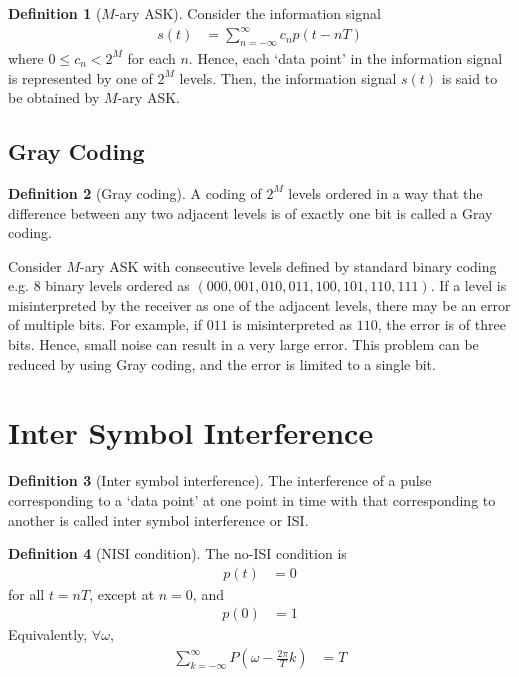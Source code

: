 \documentclass[titlepage, fleqn, a4paper, 12pt, twoside]{article}
\theoremstyle{definition}
\newtheorem{definition}{Definition}
\theoremstyle{theorem}
\begin{document}
\begin{definition}[$M$-ary ASK]
	Consider the information signal
	\begin{align*}
		s(t) &= \sum\limits_{n = -\infty}^{\infty} c_n p(t - n T)
	\end{align*}
	where $0 \le c_n < 2^M$ for each $n$.
	Hence, each `data point' in the information signal is represented by one of $2^M$ levels.
	Then, the information signal $s(t)$ is said to be obtained by $M$-ary ASK.
\end{definition}

\subsection{Gray Coding}

\begin{definition}[Gray coding]
	A coding of $2^M$ levels ordered in a way that the difference between any two adjacent levels is of exactly one bit is called a Gray coding.
\end{definition}

Consider $M$-ary ASK with consecutive levels defined by standard binary coding e.g. $8$ binary levels ordered as $(000,001,010,011,100,101,110,111)$.
If a level is misinterpreted by the receiver as one of the adjacent levels, there may be an error of multiple bits.
For example, if $011$ is misinterpreted as $110$, the error is of three bits.
Hence, small noise can result in a very large error.
This problem can be reduced by using Gray coding, and the error is limited to a single bit.

\section{Inter Symbol Interference}

\begin{definition}[Inter symbol interference]
	The interference of a pulse corresponding to a `data point' at one point in time with that corresponding to another is called inter symbol interference or ISI.
\end{definition}

\begin{definition}[NISI condition]
	The no-ISI condition is
	\begin{align*}
		p(t) &= 0
	\end{align*}
	for all $t = n T$, except at $n = 0$, and
	\begin{align*}
		p(0) &= 1
	\end{align*}
	Equivalently, $\forall \omega$,
	\begin{align*}
		\sum\limits_{k = -\infty}^{\infty} P\left( \omega - \frac{2 \pi}{T} k \right) &= T
	\end{align*}
\end{definition}
\end{document}
